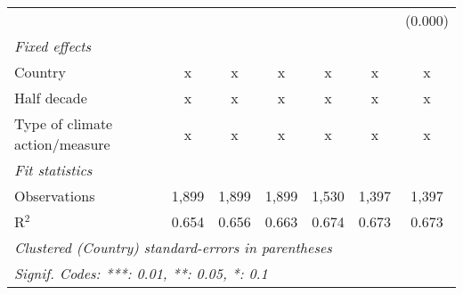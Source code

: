 \begin{tabular}{lcccccc}
                                                       &         &              &                &                &                & (0.000)\\   
   \emph{Fixed effects}\\
   Country                                             & x       & x            & x              & x              & x              & x\\  
   Half decade                                         & x       & x            & x              & x              & x              & x\\  
   Type of climate action/measure                      & x       & x            & x              & x              & x              & x\\  
   \midrule \emph{Fit statistics}\\
   Observations                                        & 1,899   & 1,899        & 1,899          & 1,530          & 1,397          & 1,397\\  
   R$^2$                                               & 0.654   & 0.656        & 0.663          & 0.674          & 0.673          & 0.673\\  
   \midrule
   \multicolumn{7}{l}{\emph{Clustered (Country) standard-errors in parentheses}}\\
   \multicolumn{7}{l}{\emph{Signif. Codes: ***: 0.01, **: 0.05, *: 0.1}}\\
\end{tabular}
\par\endgroup


